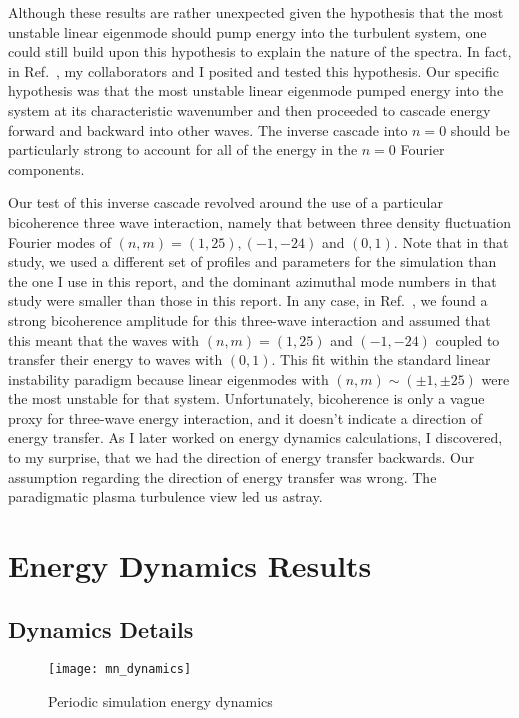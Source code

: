Although these results are rather unexpected given the hypothesis that the most unstable linear eigenmode should pump energy into the turbulent system, one could still build upon this
hypothesis to explain the nature of the spectra. 
In fact, in Ref.~\cite{Umansky2011}, my collaborators and I posited and tested this hypothesis. Our specific hypothesis was that the most unstable linear eigenmode pumped energy into the system at
its characteristic wavenumber and then proceeded to cascade energy forward and backward into other waves. The inverse cascade into $n=0$ should be particularly strong to account for all of
the energy in the $n=0$ Fourier components.

Our test of this inverse cascade revolved around the use of a particular bicoherence three wave interaction, namely that between
three density fluctuation Fourier modes of $(n,m)=(1,25),(-1,-24)$ and $(0,1)$. Note that in that study, we used a different set of profiles and parameters for the simulation 
than the one I use in this report, and the dominant azimuthal mode numbers in that study were smaller than those in this report.
In any case, in Ref.~\cite{Umansky2011}, we found a strong bicoherence amplitude for this three-wave interaction
and assumed that this meant that the waves with $(n,m)=(1,25)$ and $(-1,-24)$ coupled to transfer their energy
to waves with $(0,1)$. This fit within the standard linear instability paradigm because linear eigenmodes with $(n,m) \sim (\pm 1, \pm 25)$ were the most unstable for that system.
Unfortunately, bicoherence is only a vague proxy for three-wave energy interaction, and it doesn't indicate a direction of energy transfer. 
As I later worked on energy dynamics calculations, I discovered, to my surprise, that we had the direction of energy transfer backwards. 
Our assumption regarding the direction of energy transfer was wrong. The paradigmatic plasma turbulence view led us astray.


\section{Energy Dynamics Results}
\label{s_per_en_dyn}

\subsection{Dynamics Details}
\label{ss_dyn_details}


\begin{figure}[!ht]
\centerline{\texttt{[image: mn\_dynamics]}}
\caption{Periodic simulation energy dynamics}
\label{mn_dynamics}
\end{figure}


